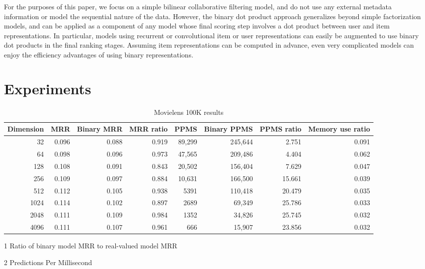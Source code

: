 \documentclass[sigchi]{acmart}
\begin{document}
For the purposes of this paper, we focus on a simple bilinear collaborative filtering model, and do not use any external metadata information or model the sequential nature of the data. However, the binary dot product approach generalizes beyond simple factorization models, and can be applied as a component of any model whose final scoring step involves a dot product between user and item representations. In particular, models using recurrent \citep{hidasi2015session} or convolutional \citep{lynch2015images} item or user representations can easily be augmented to use binary dot products in the final ranking stages. Assuming item representations can be computed in advance, even very complicated models can enjoy the efficiency advantages of using binary representations.

\section{Experiments}
\begin{table*}[htbp]
\begin{threeparttable}
\caption{Movielens 100K results}
\label{tb:results}
\centering
\begin{tabular}{rrrrrrrr}
\toprule
Dimension &   MRR & Binary MRR & MRR ratio\tnote{1} &   PPMS\tnote{2} & Binary PPMS & PPMS ratio & Memory use ratio \\
\midrule
       32 & 0.096 &      0.088 &     0.919 & 89,299 &     245,644 &      2.751 &            0.091 \\
       64 & 0.098 &      0.096 &     0.973 & 47,565 &     209,486 &      4.404 &            0.062 \\
      128 & 0.108 &      0.091 &     0.843 & 20,502 &     156,404 &      7.629 &            0.047 \\
      256 & 0.109 &      0.097 &     0.884 & 10,631 &     166,500 &     15.661 &            0.039 \\
      512 & 0.112 &      0.105 &     0.938 &   5391 &     110,418 &     20.479 &            0.035 \\
     1024 & 0.114 &      0.102 &     0.897 &   2689 &      69,349 &     25.786 &            0.033 \\
     2048 & 0.111 &      0.109 &     0.984 &   1352 &      34,826 &     25.745 &            0.032 \\
     4096 & 0.111 &      0.107 &     0.961 &    666 &      15,907 &     23.856 &            0.032 \\
\bottomrule
\end{tabular}
\begin{tablenotes}
\small{
\item[1] Ratio of binary model MRR to real-valued model MRR
\item[2] Predictions Per Millisecond
}
\end{tablenotes}
\end{threeparttable}
\end{table*}
\end{document}
